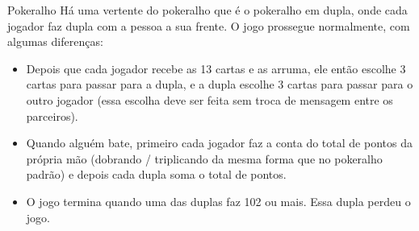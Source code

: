 \begin{subsecao}{Pokeralho}
Há uma vertente do pokeralho que é o pokeralho em dupla, onde cada jogador faz
dupla com a pessoa a sua frente. O jogo prossegue normalmente, com algumas
diferenças: 
\begin{itemize}
\item Depois que cada jogador recebe as 13 cartas e as arruma, ele então
escolhe 3 cartas para passar para a dupla, e a dupla escolhe 3 cartas para
passar para o outro jogador (essa escolha deve ser feita sem troca de mensagem
entre os parceiros). 
\item Quando alguém bate, primeiro cada jogador faz a conta do total de pontos
da própria mão (dobrando / triplicando da mesma forma que no pokeralho padrão)
e depois cada dupla soma o total de pontos. 
\item O jogo termina quando uma das duplas faz 102 ou mais. Essa dupla perdeu o
jogo. 
\pagebreak
\end{itemize}
\end{subsecao}
